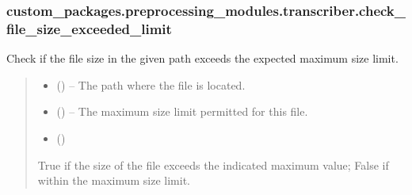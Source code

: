 \documentclass[letterpaper,10pt,english]{sphinxhowto}
\begin{document}
\subsubsection{custom\_packages.preprocessing\_modules.transcriber.check\_file\_size\_exceeded\_limit}
\label{\detokenize{_autosummary/custom_packages.preprocessing_modules.transcriber.check_file_size_exceeded_limit:custom-packages-preprocessing-modules-transcriber-check-file-size-exceeded-limit}}\label{\detokenize{_autosummary/custom_packages.preprocessing_modules.transcriber.check_file_size_exceeded_limit::doc}}

\begin{fulllineitems}
\label{\detokenize{_autosummary/custom_packages.preprocessing_modules.transcriber.check_file_size_exceeded_limit:custom_packages.preprocessing_modules.transcriber.check_file_size_exceeded_limit}}
\pysigstartsignatures
\pysiglinewithargsret
{}
{\sphinxparamcomma {}}
{}
\pysigstopsignatures
\sphinxAtStartPar
Check if the file size in the given path exceeds the expected maximum size limit.
\begin{quote}\begin{description}
\begin{itemize}
\item {} 
\sphinxAtStartPar
{} () – The path where the file is located.

\item {} 
\sphinxAtStartPar
{} () – The maximum size limit permitted for this file.

\item {} 
\sphinxAtStartPar
{} ()

\end{itemize}

\sphinxAtStartPar
True if the size of the file exceeds the indicated maximum value;
False if within the maximum size limit.

\sphinxAtStartPar
{}

\end{description}\end{quote}

\end{fulllineitems}
\end{document}
